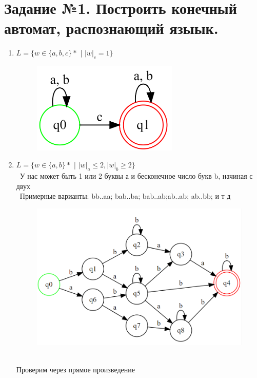 \documentclass[a4paper]{article}
\begin{document}
\section{Задание №1. Построить конечный автомат, распознающий языык.}
\begin{enumerate}
\item {$L = \{ w \in \{a,b,c\}*$ | $  {|w|_c} = 1 \} $}\\
\begin{figure}[h]
\centering
\includegraphics[width=7cm]{Задание_№1_1.png}
\end{figure}

\item {$L = \{ w \in \{a,b\}*$ | $  {|w|_a} \le 2, {|w|_b} \ge 2 \}$}\\ 
\ У нас может быть 1 или 2 буквы а и бесконечное число букв b, начиная с двух\\
\ Примерные варианты: bb..aa; bab..ba; bab..ab;ab..ab; ab..bb;  и т д  \\
\begin{figure}[h]
\centering
\includegraphics[width=18cm]{Задание_№1_2.png}
\end{figure}
\\Проверим через прямое произведение\\


\end{enumerate}
\end{document}
